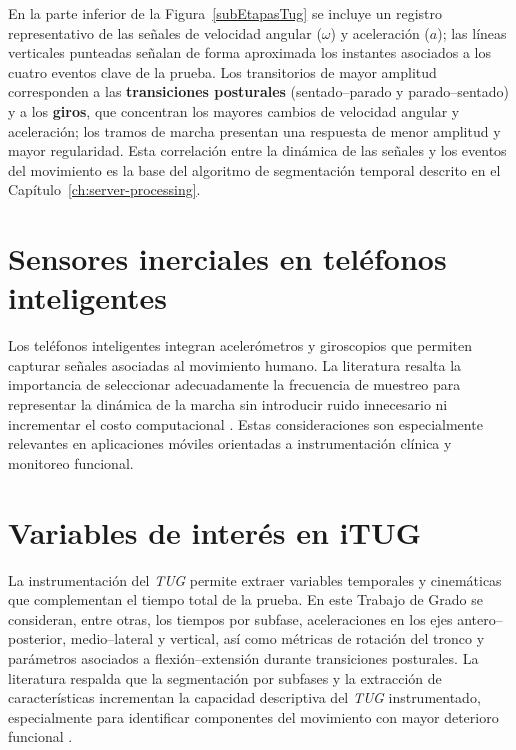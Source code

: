 \documentclass[12pt]{report}
\begin{document}
\begin{justify}
    En la parte inferior de la Figura~\ref{subEtapasTug} se incluye un registro representativo de las señales de velocidad angular ($\omega$) y aceleración ($a$); las líneas verticales punteadas señalan de forma aproximada los instantes asociados a los cuatro eventos clave de la prueba. Los transitorios de mayor amplitud corresponden a las \textbf{transiciones posturales} (sentado--parado y parado--sentado) y a los \textbf{giros}, que concentran los mayores cambios de velocidad angular y aceleración; los tramos de marcha presentan una respuesta de menor amplitud y mayor regularidad. Esta correlación entre la dinámica de las señales y los eventos del movimiento es la base del algoritmo de segmentación temporal descrito en el Capítulo~\ref{ch:server-processing}.

    \section{Sensores inerciales en teléfonos inteligentes}

    Los teléfonos inteligentes integran acelerómetros y giroscopios que permiten capturar señales asociadas al movimiento humano. La literatura resalta la importancia de seleccionar adecuadamente la frecuencia de muestreo para representar la dinámica de la marcha sin introducir ruido innecesario ni incrementar el costo computacional \cite{reliabilty-smartphone-kinematic}. Estas consideraciones son especialmente relevantes en aplicaciones móviles orientadas a instrumentación clínica y monitoreo funcional.

    \section{Variables de interés en iTUG}

    La instrumentación del \textit{TUG} permite extraer variables temporales y cinemáticas que complementan el tiempo total de la prueba. En este Trabajo de Grado se consideran, entre otras, los tiempos por subfase, aceleraciones en los ejes antero--posterior, medio--lateral y vertical, así como métricas de rotación del tronco y parámetros asociados a flexión--extensión durante transiciones posturales. La literatura respalda que la segmentación por subfases y la extracción de características incrementan la capacidad descriptiva del \textit{TUG} instrumentado, especialmente para identificar componentes del movimiento con mayor deterioro funcional \cite{iTUG}.


\end{justify}
\end{document}

